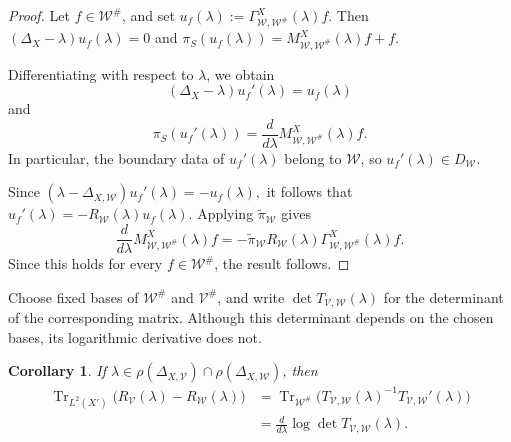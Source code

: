 \documentclass[12pt]{amsart}
\theoremstyle{plain}
\newtheorem{cor}[thm]{Corollary}
\theoremstyle{definition}
\theoremstyle{remark}
\numberwithin{equation}{section} \numberwithin{figure}{section}
\begin{document}
\begin{proof}
Let \(f\in\mathcal W^\#\), and set
\(u_f(\lambda):=
\Gamma_{\mathcal W,\mathcal W^\#}^{X}(\lambda)f\).
Then
\((\Delta_X-\lambda)u_f(\lambda)=0\) and
\(
\pi_S(u_f(\lambda))
=
M_{\mathcal W,\mathcal W^\#}^{X}(\lambda)f+f.
\)

Differentiating with respect to \(\lambda\), we obtain
\[
    (\Delta_X-\lambda)u_f'(\lambda)=u_f(\lambda)
\]
and
\[
\pi_S(u_f'(\lambda))
=
\frac{d}{d\lambda}
M_{\mathcal W,\mathcal W^\#}^{X}(\lambda)f.
\]
In particular, the boundary data of \(u_f'(\lambda)\) belong to
\(\mathcal W\), so \(u_f'(\lambda)\in D_{\mathcal W}\).

Since
\(
(\lambda-\Delta_{X,\mathcal W})u_f'(\lambda)
=
-u_f(\lambda),
\)
it follows that
\(
u_f'(\lambda)
=
-R_{\mathcal W}(\lambda)u_f(\lambda).
\)
Applying \(\widetilde{\pi}_{\mathcal W}\) gives
\[
\frac{d}{d\lambda}
M_{\mathcal W,\mathcal W^\#}^{X}(\lambda)f
=
-\widetilde{\pi}_{\mathcal W}
R_{\mathcal W}(\lambda)
\Gamma_{\mathcal W,\mathcal W^\#}^{X}(\lambda)f.
\]
Since this holds for every \(f\in\mathcal W^\#\), the result follows.
\end{proof}

Choose fixed bases of \(\mathcal W^\#\) and \(\mathcal V^\#\), and
write \(\det T_{\mathcal V,\mathcal W}(\lambda)\) for the
determinant of the corresponding matrix. Although this determinant
depends on the chosen bases, its logarithmic derivative does not.

\begin{cor}\label{cor:resolvent-trace-identity}
If
\(\lambda\in
\rho(\Delta_{X,\mathcal V})
\cap\rho(\Delta_{X,\mathcal W})\), then
\[
\begin{aligned}
\operatorname{Tr}_{L^2(X')}
\bigl(R_{\mathcal V}(\lambda)-R_{\mathcal W}(\lambda)\bigr)
&=
\operatorname{Tr}_{\mathcal W^\#}
\bigl(
T_{\mathcal V,\mathcal W}(\lambda)^{-1}
T_{\mathcal V,\mathcal W}'(\lambda)
\bigr) \\
&=
\frac{d}{d\lambda}
\log\det T_{\mathcal V,\mathcal W}(\lambda).
\end{aligned}
\]
\end{cor}
\end{document}
